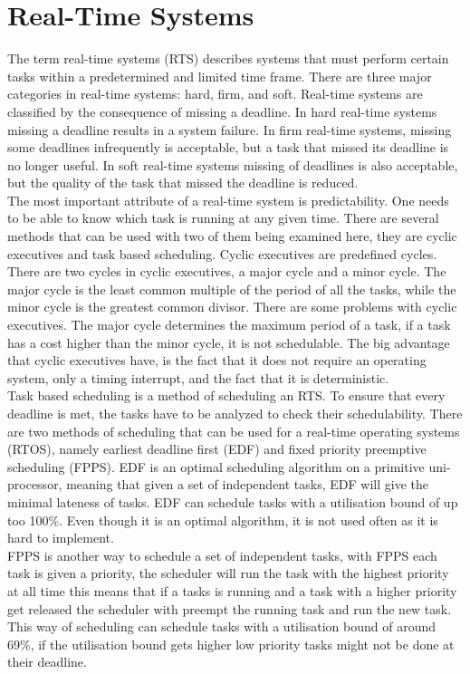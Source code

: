 \section{Real-Time Systems}\label{sec:realtimesystems}\label{\automlabel}

The term real-time systems (RTS) describes systems that must perform certain tasks within a predetermined and limited time frame. There are three major categories in real-time systems: hard, firm, and soft. Real-time systems are classified by the consequence of missing a deadline. In hard real-time systems missing a deadline results in a system failure. In firm real-time systems, missing some deadlines infrequently is acceptable, but a task that missed its deadline is no longer useful. In soft real-time systems missing of deadlines is also acceptable, but the quality of the task that missed the deadline is reduced. \\

The most important attribute of a real-time system is predictability. One needs to be able to know which task is running at any given time. There are several methods that can be used with two of them being examined here, they are cyclic executives and task based scheduling. Cyclic executives are predefined cycles. There are two cycles in cyclic executives, a major cycle and a minor cycle. The major cycle is the least common multiple of the period of all the tasks, while the minor cycle is the greatest common divisor. There are some problems with cyclic executives. The major cycle determines the maximum period of a task, if a task has a cost higher than the minor cycle, it is not schedulable. The big advantage that cyclic executives have, is the fact that it does not require an operating system, only a timing interrupt, and the fact that it is deterministic. \\

Task based scheduling is a method of scheduling an RTS. To ensure that every deadline is met, the tasks have to be analyzed to check their schedulability. There are two methods of scheduling that can be used for a real-time operating systems (RTOS), namely earliest deadline first (EDF) and fixed priority preemptive scheduling (FPPS). EDF is an optimal scheduling algorithm on a primitive uni-processor, meaning that given a set of independent tasks, EDF will give the minimal lateness of tasks. EDF can schedule tasks with a utilisation bound of up too 100\%. Even though it is an optimal algorithm, it is not used often as it is hard to implement. \\

FPPS is another way to schedule a set of independent tasks, with FPPS each task is given a priority, the scheduler will run the task with the highest priority at all time this means that if a tasks is running and a task with a higher priority get released the scheduler with preempt the running task and run the new task. This way of scheduling can schedule tasks with a utilisation bound of around 69\%, if the utilisation bound gets higher low priority tasks might not be done at their deadline. \cite{Scheduling}

\eal